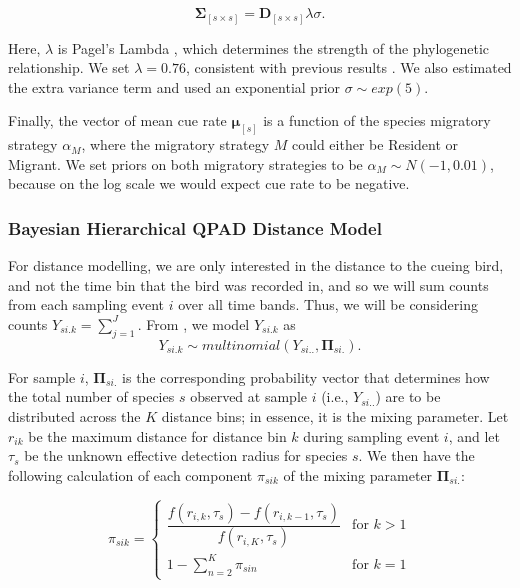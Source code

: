 \documentclass[12pt]{article}
\begin{document}
$$\mathbf{\Sigma}_{[s \times s]} = \mathbf{D}_{[s \times s]}\lambda\sigma.$$

\par Here, $\lambda$ is Pagel's Lambda \citep{pagel_inferring_1999}, which determines the strength of the phylogenetic relationship. 
We set $\lambda = 0.76$, consistent with previous results \cite{solymos_phylogeny_2018}. 
We also estimated the extra variance term and used an exponential prior $\sigma \sim exp(5)$.

\par Finally, the vector of mean cue rate $\mathbf{\mu}_{[s]}$ is a function of the species migratory strategy $\alpha_M$, where the migratory strategy $M$ could either be Resident or Migrant. 
We set priors on both migratory strategies to be $\alpha_M \sim N(-1, 0.01)$, because on the log scale we would expect cue rate to be negative. 

\subsubsection{Bayesian Hierarchical QPAD Distance Model}

\par For distance modelling, we are only interested in the distance to the cueing bird, and not the time bin that the bird was recorded in, and so we will sum counts from each sampling event $i$ over all time bands. 
Thus, we will be considering counts $Y_{si.k} = \sum_{j=1}^{J}$. 
From \citet{solymos_calibrating_2013}, we model $Y_{si.k}$ as
$$Y_{si.k} \sim multinomial\left(Y_{si..}, \mathbf{\Pi}_{si.}\right).$$

\par For sample $i$, $\mathbf{\Pi}_{si.}$ is the corresponding probability vector that determines how the total number of species $s$ observed at sample $i$ (i.e., $Y_{si..}$) are to be distributed across the $K$ distance bins; in essence, it is the mixing parameter. 
Let $r_{ik}$ be the maximum distance for distance bin $k$ during sampling event $i$, and let $\tau_s$ be the unknown effective detection radius for species $s$. 
We then have the following calculation of each component $\pi_{sik}$ of the mixing parameter $\mathbf{\Pi}_{si.}$:

\begin{equation*}
	\pi_{sik} = 
	\begin{cases}
		\dfrac{f(r_{i,k}, \tau_s) - f(r_{i,k-1}, \tau_s)}{f(r_{i,K}, \tau_s)} & \text{for } k > 1 \\
		1 - \sum_{n = 2}^{K} \pi_{sin} & \text{for } k = 1
	\end{cases}
\end{equation*}
\end{document}
